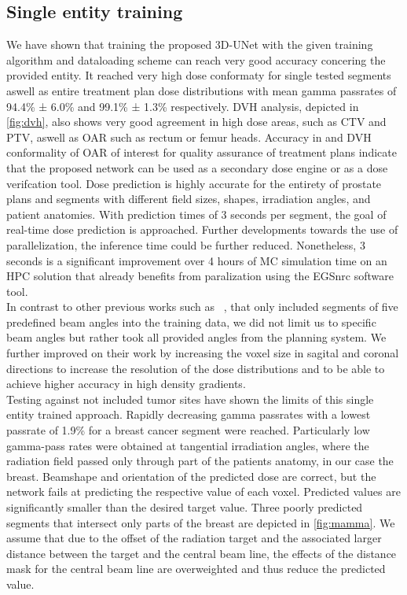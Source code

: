 \subsection{Single entity training}\label{ssec:SET}

We have shown that training the proposed 3D-UNet with the given training algorithm and dataloading scheme can reach very good accuracy concering the provided entity. 
It reached very high dose conformaty for single tested segments aswell as entire treatment plan dose distributions with mean gamma passrates of 94.4\% ± 6.0\% and 99.1\% ± 1.3\% respectively. 
DVH analysis, depicted in \autoref{fig:dvh}, also shows very good agreement in high dose areas, such as CTV and PTV, aswell as \acs{OAR} such as rectum or femur heads.
Accuracy in and DVH conformality of \acs{OAR} of interest for quality assurance of treatment plans indicate that the proposed network can be used as a secondary dose engine or as a dose verifcation tool.
Dose prediction is highly accurate for the entirety of prostate plans and segments with different field sizes, shapes, irradiation angles, and patient anatomies.
With prediction times of 3 seconds per segment, the goal of real-time dose prediction is approached. 
Further developments towards the use of parallelization, the inference time could be further reduced. 
Nonetheless, 3 seconds is a significant improvement over 4 hours of \acs{MC} simulation time on an \acs{HPC} solution that already benefits from paralization using the EGSnrc software tool.\\
In contrast to other previous works such as \citeauthor{kontaxis_deepdose_2020}~\cite{kontaxis_deepdose_2020}, that only included segments of five predefined beam angles into the training data, we did not limit us to specific beam angles but rather took all provided angles from the planning system.
We further improved on their work by increasing the voxel size in sagital and coronal directions to increase the resolution of the dose distributions and to be able to achieve higher accuracy in high density gradients. \\
Testing against not included tumor sites have shown the limits of this single entity trained approach. 
Rapidly decreasing gamma passrates with a lowest passrate of 1.9\% for a breast cancer segment were reached. 
Particularly low gamma-pass rates were obtained at tangential irradiation angles, where the radiation field passed only through part of the patients anatomy, in our case the breast.
Beamshape and orientation of the predicted dose are correct, but the network fails at predicting the respective value of each voxel.
Predicted values are significantly smaller than the desired target value.  
Three poorly predicted segments that intersect only parts of the breast are depicted in \autoref{fig:mamma}.
We assume that due to the offset of the radiation target and the associated larger distance between the target and the central beam line, the effects of the distance mask for the central beam line are overweighted and thus reduce the predicted value.\\

